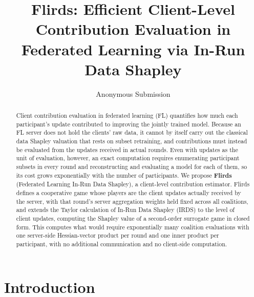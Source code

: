 \documentclass[letterpaper]{article} %
\title{Flirds: Efficient Client-Level Contribution Evaluation in Federated Learning via In-Run Data Shapley}
\author{ 
    Anonymous Submission
}
\theoremstyle{definition} %
\begin{document}
\maketitle

\begin{abstract}
Client contribution evaluation in federated learning (FL) quantifies how much
each participant's update contributed to improving the jointly trained model.
Because an FL server does not hold the clients' raw data, it cannot by itself
carry out the classical data Shapley valuation that rests on subset
retraining, and contributions must instead be evaluated from the updates
received in actual rounds. Even with updates as the unit of evaluation,
however, an exact computation requires enumerating participant subsets in
every round and reconstructing and evaluating a model for each of them, so
its cost grows exponentially with the number of participants.
We propose \textbf{Flirds} (Federated Learning In-Run Data Shapley), a
client-level contribution estimator. Flirds defines a cooperative game whose
players are the client updates actually received by the server, with that
round's server aggregation weights held fixed across all coalitions, and
extends the Taylor calculation of In-Run Data Shapley (IRDS) to the level of
client updates, computing the Shapley value of a second-order surrogate game
in closed form. This computes what would require exponentially many coalition
evaluations with one server-side Hessian-vector product per round and one
inner product per participant, with no additional communication and no
client-side computation.
\end{abstract}


\section{Introduction}
\label{sec:intro}
\end{document}
